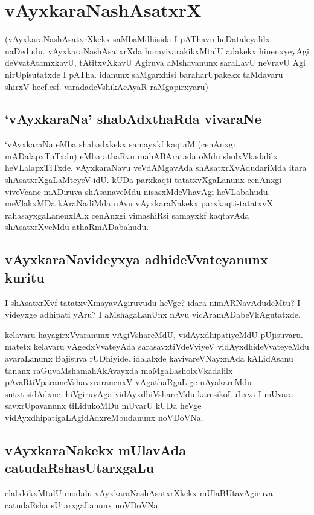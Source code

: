 \chapter{vAyxkaraNashAsatxrX}

(vAyxkaraNashAsatxrXkekx saMbaMdhisida I pAThavu  heDataleyalilx naDedudu. vAyxkaraNashAsatxrXda horavivarakikxMtalU adakekx hinenxyeyAgi deVvatAtamxkavU, tAtitxvXkavU Agiruva aMshavanunx saraLavU neVravU Agi nirUpisutatxde I pATha. idanunx saMgarxhisi baraharUpakekx taMdavaru shirxV hecf.esf. varadadeVshikAcAyaR raMgapirxyaru)

\section*{`vAyxkaraNa' shabAdxthaRda vivaraNe}

`vAyxkaraNa eMba shabadxkekx samayxkf kaqtaM (cenAnxgi mADalapxTuTxdu) eMba athaRvu mahABAratada oMdu sholxVkadalilx heVLalapxTiTxde. vAyxkaraNavu  veVdAMgavAda shAsatxrXvAdudariMda itara shAsatxrXgaLaMteyeV idU. kUDa parxkaqti tatatxvXgaLanunx cenAnxgi viveVcane mADiruva shAsanaveMdu nisasxMdeVhavAgi heVLabahudu. meVlakxMDa kAraNadiMda nAvu vAyxkaraNakekx parxkaqti-tatatxvX  rahasayxgaLanenxlAlx cenAnxgi vimashiRsi samayxkf kaqtavAda shAsatxrXveMdu athaRmADabahudu.

\section*{vAyxkaraNavideyxya adhideVvateyanunx kuritu}

I shAsatxrXvf tatatxvXmayavAgiruvudu heVge? idara nimARNavAdudeMtu? I videyxge adhipati  yAru? I aMshagaLanUnx nAvu vicAramADabeVkAgutatxde.

kelavaru hayagirxVvaranunx vAgiVshareMdU, vidAyxdhipatiyeMdU pUjisuvaru. matetx kelavaru vAgedxVvateyAda sarasavxtiVdeVviyeV vidAyxdhideVvateyeMdu avaraLanunx Bajisuva rUDhiyide. idalalxde kavivareVNayxnAda kALidAsanu tananx raGuvaMshamahAkAvayxda maMgaLasholxVkadalilx pAvaRtiVparameVshavxraranenxV vAgathaRgaLige nAyakareMdu sutxtisidAdxne. hiVgiruvAga vidAyxdhiVshareMdu karesikoLuLxva I mUvara savxrUpavanunx tiLidukoMDu mUvarU kUDa heVge vidAyxdhipatigaLAgidAdxreMbudanunx noVDoVNa.

\section*{vAyxkaraNakekx mUlavAda catudaRshasUtarxgaLu}

elalxkikxMtalU modalu vAyxkaraNashAsatxrXkekx  mUlaBUtavAgiruva catudaRsha sUtarxgaLanunx noVDoVNa.

